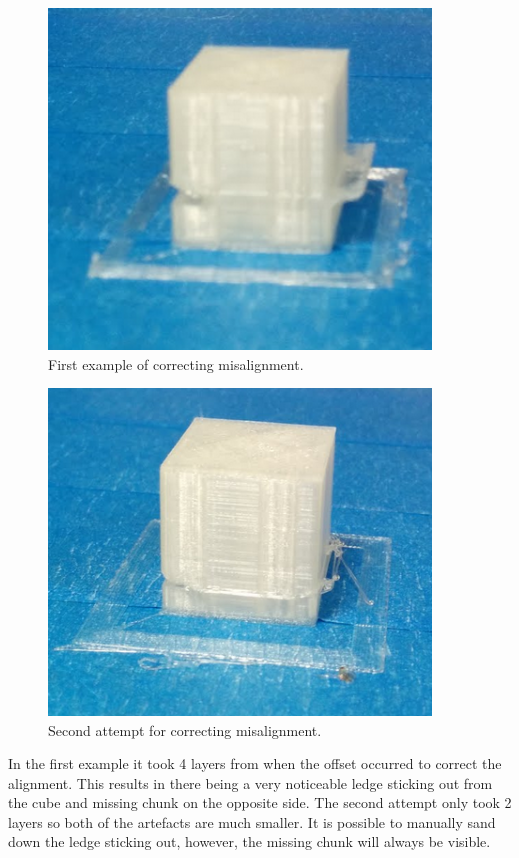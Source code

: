 \documentclass[pdftex, 11pt]{report} %
\begin{document}
\begin{figure}[H]
  \centering
  \includegraphics[width=4in]{Misalign2.png}
  \caption{First example of correcting misalignment.}
  \label{figure:Misalign2}
\end{figure}

\begin{figure}[H]
  \centering
  \includegraphics[width=4in]{Misalign3.png}
  \caption{Second attempt for correcting misalignment.}
  \label{figure:Misalign3}
\end{figure}

In the first example it took 4 layers from when the offset occurred to correct the alignment. This results in there being a very noticeable ledge sticking out from the cube and missing chunk on the opposite side. The second attempt only took 2 layers so both of the artefacts are much smaller. It is possible to manually sand down the ledge sticking out, however, the missing chunk will always be visible. 
\end{document}
